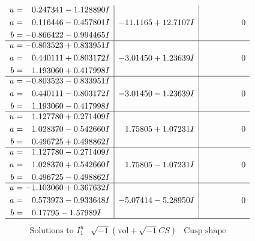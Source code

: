 \documentclass[1p]{elsarticle_modified}
\theoremstyle{definition}
\newcommand{\I}{\sqrt{-1}}
\begin{document}
$$\begin{array}{c|c|c}
\begin{aligned}
u &= \phantom{-}0.247341 - 1.128890 I \\
a &= \phantom{-}0.116446 - 0.457801 I \\
b &= -0.866422 - 0.994465 I\end{aligned}
 & -11.1165 + 12.7107 I & \phantom{-0.000000 } 0 \\ \hline\begin{aligned}
u &= -0.803523 + 0.833951 I \\
a &= \phantom{-}0.440111 + 0.803172 I \\
b &= \phantom{-}1.193060 + 0.417998 I\end{aligned}
 & -3.01450 + 1.23639 I & \phantom{-0.000000 } 0 \\ \hline\begin{aligned}
u &= -0.803523 - 0.833951 I \\
a &= \phantom{-}0.440111 - 0.803172 I \\
b &= \phantom{-}1.193060 - 0.417998 I\end{aligned}
 & -3.01450 - 1.23639 I & \phantom{-0.000000 } 0 \\ \hline\begin{aligned}
u &= \phantom{-}1.127780 + 0.271409 I \\
a &= \phantom{-}1.028370 - 0.542660 I \\
b &= \phantom{-}0.496725 + 0.498862 I\end{aligned}
 & \phantom{-}1.75805 + 1.07231 I & \phantom{-0.000000 } 0 \\ \hline\begin{aligned}
u &= \phantom{-}1.127780 - 0.271409 I \\
a &= \phantom{-}1.028370 + 0.542660 I \\
b &= \phantom{-}0.496725 - 0.498862 I\end{aligned}
 & \phantom{-}1.75805 - 1.07231 I & \phantom{-0.000000 } 0 \\ \hline\begin{aligned}
u &= -1.103060 + 0.367632 I \\
a &= \phantom{-}0.573973 - 0.933648 I \\
b &= \phantom{-}0.17795 - 1.57989 I\end{aligned}
 & -5.07414 - 5.28950 I & \phantom{-0.000000 } 0\\
 \hline 
 \end{array}$$\newpage$$\begin{array}{c|c|c}  
\text{Solutions to }I^u_{1}& \I (\text{vol} + \sqrt{-1}CS) & \text{Cusp shape}\\

\end{array}$$
\end{document}

